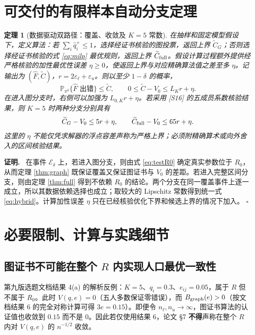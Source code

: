 \documentclass[11pt,a4paper]{ctexart}
\newtheorem{theorem}{定理}[section]
\theoremstyle{definition}
\newenvironment{proofcn}{\par\noindent\textbf{证明.}\ }{\hfill$\square$\par}
\newcommand{\Pp}{\mathbb P}
\newcommand{\epsl}{\varepsilon_{\ell}}
\newcommand{\epsu}{\varepsilon_u}
\begin{document}
\section{可交付的有限样本自动分支定理}
\begin{theorem}[数据驱动双路径：覆盖、收敛及 $K=5$ 常数]\label{thm:hybrid}
在抽样和固定模型假设下，定义算法：若 $\sum_i\hat q_i^+\le1$，选择经证书核验的图投票，返回上界 $\widetilde C_G$；否则选择经证书核验的式 \eqref{eq:milp} 最优规则，返回上界 $\widetilde C_{\rm full}$。假设计算过程额外提供经\emph{严格核验}的加性最优性误差 $\eta\ge0$，使返回上界与对应精确算法值之差至多 $\eta$。记输出为 $(\widehat F,\widetilde C)$，$r=2\epsl+\epsu$。则以至少 $1-\delta$ 的概率，
\begin{equation}\label{eq:hybrid}
\Pp_{\pi^0}\{\widehat F\text{ 出错}\}\le\widetilde C,
\qquad0\le\widetilde C-V_0\le L_K r+\eta.
\end{equation}
在进入图分支时，右侧可以加强为 $L_{0,K}r+\eta$。若采用 [S16] 的五成员系数核验结果，则 $K=5$ 时两种分支分别具有
\[
\widetilde C_G-V_0\le 5r+\eta,\qquad
\widetilde C_{\rm full}-V_0\le65r+\eta.
\]
这里的 $\eta$ 不能仅凭求解器的浮点容差声称为严格上界；必须附精确算术或向外舍入的区间核验结果。
\end{theorem}
\begin{proofcn}
在事件 $\mathcal E_\delta$ 上，若进入图分支，则由式 \eqref{eq:testR0} 确定真实参数位于 $R_0$，从而定理 \ref{thm:graph} 既保证覆盖又保证图证书与 $V_0$ 的差距。若进入完整区间分支，则由定理 \ref{thm:full} 得到不依赖 $R_0$ 的结论。两个分支在同一覆盖事件上逐一成立，所以其数据依赖选择也成立；取较大的 Lipschitz 常数得到统一式 \eqref{eq:hybrid}。计算加性误差 $\eta$ 只在已经核验优化下界和候选上界的情况下加入。
\end{proofcn}

\section{必要限制、计算与实践细节}
\subsection{图证书不可能在整个 $R$ 内实现人口最优一致性}
第九版选题文档结果 4(a) 的解析反例：$K=5$、$q_i=0.3$、$e_{ij}=0.05$，属于 $R$ 但不属于 $R_0$。此时 $V(q,e)=0$（五人多数保证零错误），而 $B_{\rm graph}(e)>0$（按文档结果 6 的完全对称计算可得 $3e=0.15$）。即便令 $n_\ell,n_u\to\infty$，图证书算法的认证值也收敛到 $0.15$ 而不是 $0$。因此若仅使用结果 6，论文 \S7 \textbf{不得}声称在整个 $R$ 内对 $V(q,e)$ 的 $n^{-1/2}$ 收敛。
\end{document}
